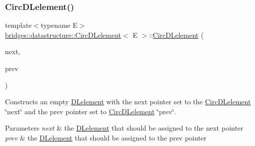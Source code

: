 \subsubsection{\texorpdfstring{Circ\+D\+Lelement()}{CircDLelement()}\hspace{0.1cm}{\footnotesize\ttfamily [3/4]}}
{\footnotesize\ttfamily template$<$typename E$>$ \\
\hyperlink{classbridges_1_1datastructure_1_1_circ_d_lelement}{bridges\+::datastructure\+::\+Circ\+D\+Lelement}$<$ E $>$\+::\hyperlink{classbridges_1_1datastructure_1_1_circ_d_lelement}{Circ\+D\+Lelement} (\begin{DoxyParamCaption}\item[{\hyperlink{classbridges_1_1datastructure_1_1_circ_d_lelement}{Circ\+D\+Lelement}$<$ E $>$}]{next,  }\item[{\hyperlink{classbridges_1_1datastructure_1_1_circ_d_lelement}{Circ\+D\+Lelement}$<$ E $>$}]{prev }\end{DoxyParamCaption})\hspace{0.3cm}{\ttfamily [inline]}}

Constructs an empty \hyperlink{classbridges_1_1datastructure_1_1_d_lelement}{D\+Lelement} with the next pointer set to the \hyperlink{classbridges_1_1datastructure_1_1_circ_d_lelement}{Circ\+D\+Lelement} \char`\"{}next\char`\"{} and the prev pointer set to \hyperlink{classbridges_1_1datastructure_1_1_circ_d_lelement}{Circ\+D\+Lelement} \char`\"{}prev\char`\"{}.


\begin{DoxyParams}{Parameters}
{\em next} & the \hyperlink{classbridges_1_1datastructure_1_1_d_lelement}{D\+Lelement} that should be assigned to the next pointer \\
\hline
{\em prev} & the \hyperlink{classbridges_1_1datastructure_1_1_d_lelement}{D\+Lelement} that should be assigned to the prev pointer \\
\hline
\end{DoxyParams}
\mbox{\label{classbridges_1_1datastructure_1_1_circ_d_lelement_a52b304df48ac1ba5a13b4c3c596f433b}} 
